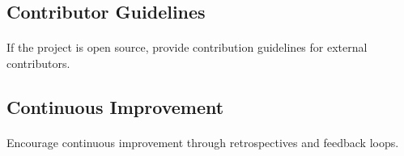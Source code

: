 \documentclass{article}
\begin{document}
\subsection{Contributor Guidelines}
\paragraph{}
If the project is open source, provide contribution guidelines for external contributors.

\subsection{Continuous Improvement}
\paragraph{}
Encourage continuous improvement through retrospectives and feedback loops.
\end{document}
